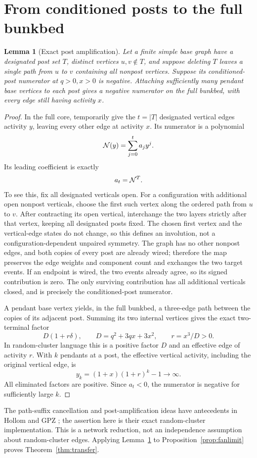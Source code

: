 \documentclass[11pt,a4paper]{article}
\newtheorem{lemma}[theorem]{Lemma}
\theoremstyle{remark}\newtheorem{remark}[theorem]{Remark}
\begin{document}
\section{From conditioned posts to the full bunkbed}\label{sec:posts}
\begin{lemma}[Exact post amplification]\label{lem:amplify}
Let a finite simple base graph have a designated post set $T$, distinct vertices $u,v\notin T$, and suppose deleting $T$ leaves a single path from $u$ to $v$ containing all nonpost vertices. Suppose its conditioned-post numerator at $q>0,x>0$ is negative. Attaching sufficiently many pendant base vertices to each post gives a negative numerator on the full bunkbed, with every edge still having activity $x$.
\end{lemma}
\begin{proof}
In the full core, temporarily give the $t=|T|$ designated vertical edges activity $y$, leaving every other edge at activity $x$. Its numerator is a polynomial
\[
\mathcal N(y)=\sum_{j=0}^t a_jy^j.
\]
Its leading coefficient is exactly
\begin{equation}\label{eq:leading}
a_t=\mathcal N^T.
\end{equation}
To see this, fix all designated verticals open. For a configuration with additional open nonpost verticals, choose the first such vertex along the ordered path from $u$ to $v$. After contracting its open vertical, interchange the two layers strictly after that vertex, keeping all designated posts fixed. The chosen first vertex and the vertical-edge states do not change, so this defines an involution, not a configuration-dependent unpaired symmetry. The graph has no other nonpost edges, and both copies of every post are already wired; therefore the map preserves the edge weights and component count and exchanges the two target events. If an endpoint is wired, the two events already agree, so its signed contribution is zero. The only surviving contribution has all additional verticals closed, and is precisely the conditioned-post numerator.

A pendant base vertex yields, in the full bunkbed, a three-edge path between the copies of its adjacent post. Summing its two internal vertices gives the exact two-terminal factor
\[
D(1+r\delta),\qquad D=q^2+3qx+3x^2,\qquad r=x^3/D>0.
\]
In random-cluster language this is a positive factor $D$ and an effective edge of activity $r$. With $k$ pendants at a post, the effective vertical activity, including the original vertical edge, is
\begin{equation}\label{eq:yk}
y_k=(1+x)(1+r)^k-1\longrightarrow\infty.
\end{equation}
All eliminated factors are positive. Since $a_t<0$, the numerator is negative for sufficiently large $k$.
\end{proof}
The path-suffix cancellation and post-amplification ideas have antecedents in Hollom and GPZ \cite{Hollom,GPZ}; the assertion here is their exact random-cluster implementation. This is a network reduction, not an independence assumption about random-cluster edges. Applying Lemma~\ref{lem:amplify} to Proposition~\ref{prop:fanlimit} proves Theorem~\ref{thm:transfer}.
\end{document}
